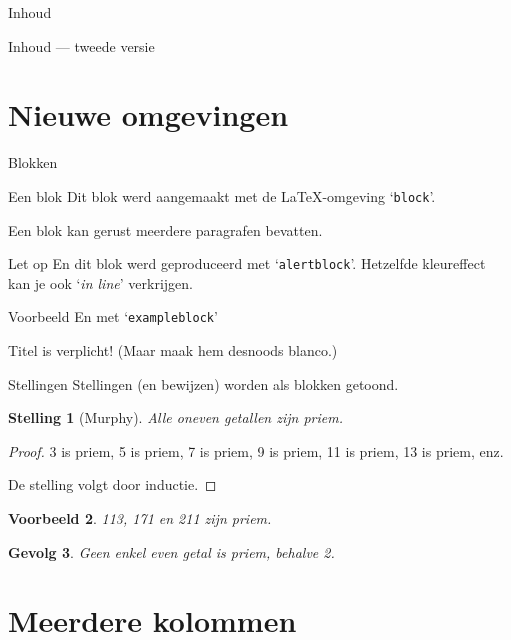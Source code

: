 \documentclass{beamer} %
\newtheorem{stelling}{Stelling}
\newtheorem{gevolg}[stelling]{Gevolg}
\newtheorem{voorbeeld}[stelling]{Voorbeeld}
\begin{document}
\begin{frame}{Inhoud}
\tableofcontents  %
\end{frame}

\begin{frame}{Inhoud --- tweede versie}
\tableofcontents[currentsection]
\end{frame}

\section{Nieuwe omgevingen}
%
\begin{frame}{\secname}{Blokken}
  \begin{block}{Een blok}
  Dit blok werd aangemaakt met de \LaTeX-omgeving `\texttt{block}'.

  Een blok kan gerust meerdere paragrafen bevatten.
  \end{block}
  \pause
  \begin{alertblock}{Let op}
  En dit blok werd geproduceerd met `\texttt{alertblock}'. Hetzelfde
  kleureffect kan je ook \alert{`\emph{in line}'} verkrijgen.
  \end{alertblock}
  \pause
  \begin{exampleblock}{Voorbeeld}
  En met `\texttt{exampleblock}'
  \end{exampleblock}
  Titel is verplicht! (Maar maak hem desnoods blanco.)
\end{frame}

\begin{frame}{Stellingen}
Stellingen (en bewijzen) worden als blokken getoond.
\begin{stelling}[Murphy]
Alle oneven getallen zijn priem.
\end{stelling}
\begin{proof}
3 is priem, 5 is priem, 7 is priem, 9 is priem, 11 is priem, 13 is priem, enz.

De stelling volgt door inductie.
\end{proof}
\begin{voorbeeld}
113, 171 en 211 zijn priem.
\end{voorbeeld}
\begin{gevolg}
Geen enkel even getal is priem, behalve 2.
\end{gevolg}
\end{frame}


\section{Meerdere kolommen}
\end{document}
